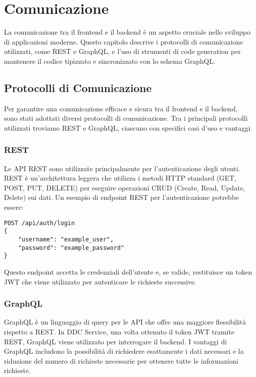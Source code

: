 \section{Comunicazione}
\label{sec:comunicazione}

La comunicazione tra il frontend e il backend è un aspetto cruciale nello sviluppo di applicazioni moderne.
Questo capitolo descrive i protocolli di comunicazione utilizzati, come REST e GraphQL, e l'uso di strumenti di code generation per mantenere il codice tipizzato e sincronizzato con lo schema GraphQL.

\subsection{Protocolli di Comunicazione}
\label{subsec:protocolli_comunicazione}

Per garantire una comunicazione efficace e sicura tra il frontend e il backend, sono stati adottati diversi protocolli di comunicazione.
Tra i principali protocolli utilizzati troviamo REST e GraphQL, ciascuno con specifici casi d'uso e vantaggi.

\subsubsection*{REST}
Le API REST sono utilizzate principalmente per l'autenticazione degli utenti.
REST è un'architettura leggera che utilizza i metodi HTTP standard (GET, POST, PUT, DELETE) per eseguire operazioni CRUD (Create, Read, Update, Delete) sui dati.
Un esempio di endpoint REST per l'autenticazione potrebbe essere:
\begin{verbatim}
POST /api/auth/login
{
    "username": "example_user",
    "password": "example_password"
}
\end{verbatim}

Questo endpoint accetta le credenziali dell'utente e, se valide, restituisce un token JWT che viene utilizzato per autenticare le richieste successive.

\subsubsection*{GraphQL}
GraphQL è un linguaggio di query per le API che offre una maggiore flessibilità rispetto a REST.
In DDC Service, una volta ottenuto il token JWT tramite REST, GraphQL viene utilizzato per interrogare il backend.
I vantaggi di GraphQL includono la possibilità di richiedere esattamente i dati necessari e la riduzione del numero di richieste necessarie per ottenere tutte le informazioni richieste.

